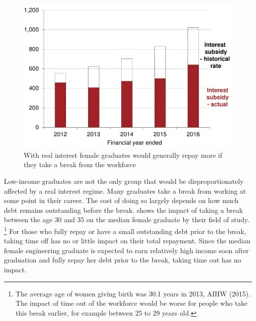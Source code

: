 \documentclass[embargoed]{grattan}
\begin{document}
{\begin{figure}
\caption{With real interest female graduates would generally repay more if they take a break from the workforce}\label{fig:fig15-with-real-interest-female-grads-would-repay-more-if-they-took-break-from-workforce}


\includegraphics[page=15]{atlas/Chartpack.pdf}
\end{figure}

Low-income graduates are not the only group that would be disproportionately affected by a real interest regime.
Many graduates take a break from working at some point in their career.
The cost of doing so largely depends on how much debt remains outstanding before the break.
 shows the impact of taking a break between the age 30 and 35 on the median female graduate by their field of study.%
\footnote{The average age of women giving birth was 30.1 years in 2013, AIHW (2015).
The impact of time out of the workforce would be worse for people who take this break earlier, for example between 25 to 29 years old.} For those who fully repay or have a small outstanding debt prior to the break, taking time off has no or little impact on their total repayment.
Since the median female engineering graduate is expected to earn relatively high income soon after graduation and fully repay her debt prior to the break, taking time out has no impact.

}
\end{document}
